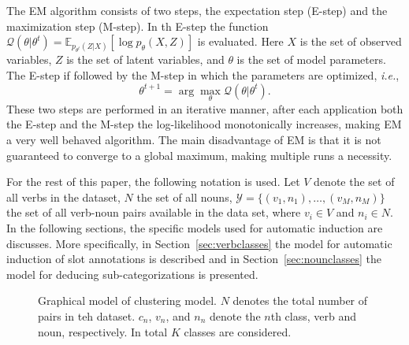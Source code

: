 \documentclass[11pt]{scrartcl}
\newcommand{\ie}{\textit{i.e.}}
\begin{document}
The EM algorithm consists of two steps, the expectation step (E-step)
and the maximization step (M-step). In th E-step the function
$\mathcal{Q}(\theta|\theta^t) =
\mathbb{E}_{p_{\theta^t}(Z|X)}[\log p_{\theta}(X, Z)]$ is evaluated. Here 
$X$ is the set of observed variables, $Z$ is the set of latent
variables, and $\theta$ is the set of model parameters. The E-step if
followed by the M-step in which the parameters are optimized, \ie,
\[
  \theta^{t+1} = \arg\max_{\theta} \mathcal{Q}(\theta | \theta^t).
\]
These two steps are performed in an iterative manner, after each
application both the E-step and the M-step the log-likelihood
monotonically increases, making EM a very well behaved algorithm. The
main disadvantage of EM is that it is not guaranteed to converge to
a global maximum, making multiple runs a necessity.

For the rest of this paper, the following notation is used. Let $V$
denote the set of all verbs in the dataset, $N$
the set of all nouns, $\mathcal{Y} = \{(v_1, n_1), \ldots, (v_M,
n_M)\}$ the set of all verb-noun pairs available in the data set, where
$v_i \in V$ and $n_i \in N$. In the following sections, the specific
models used for automatic induction are discusses. More specifically,
in Section~\ref{sec:verbclasses} the model for automatic induction of
slot annotations is described and in Section~\ref{sec:nounclasses} the
model for deducing sub-categorizations is presented.

\begin{figure}
\centering
{}
\caption{Graphical model of clustering model. $N$ denotes the total
number of pairs in teh dataset. $c_n$, $v_n$, and $n_n$ denote the
$n$th class, verb and noun, respectively. In total $K$ classes are
considered.}
\label{fig:graphmodel}
\end{figure}
\end{document}
